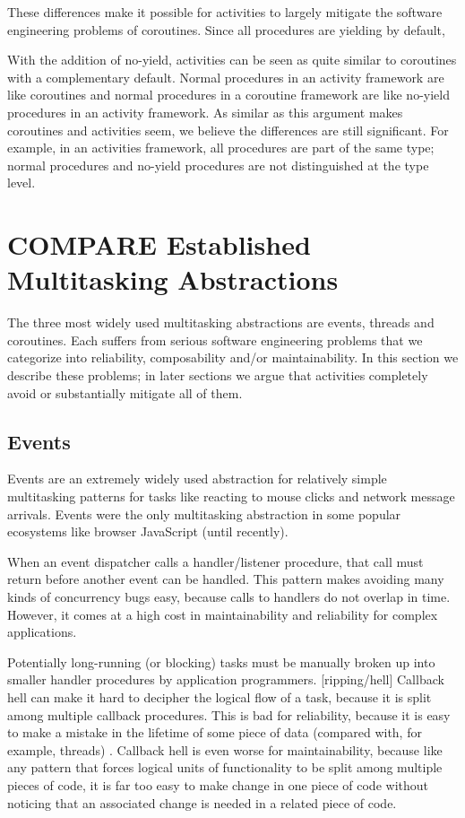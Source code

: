 \documentclass[10pt,preprint]{sigplanconf}
\begin{document}
These differences make it possible for activities to largely mitigate the software engineering problems of coroutines.
Since all procedures are yielding by default, 

With the addition of no-yield, activities can be seen as quite similar to coroutines with a complementary default.
Normal procedures in an activity framework are like coroutines and normal procedures in a coroutine framework are like no-yield procedures in an activity framework.
As similar as this argument makes coroutines and activities seem, we believe the differences are still significant.
For example, in an activities framework, all procedures are part of the same type; normal procedures and no-yield procedures are not distinguished at the type level.

\section{COMPARE Established Multitasking Abstractions}



The three most widely used multitasking abstractions are events, threads and coroutines.
Each suffers from serious software engineering problems that we categorize into reliability, composability and/or maintainability.
In this section we describe these problems; in later sections we argue that activities completely avoid or substantially mitigate all of them.

\subsection{Events}

Events are an extremely widely used abstraction for relatively simple multitasking patterns for tasks like reacting to mouse clicks and network message arrivals.
Events were the only multitasking abstraction in some popular ecosystems like browser JavaScript (until recently).

When an event dispatcher calls a handler/listener procedure, that call must return before another event can be handled.
This pattern makes avoiding many kinds of concurrency bugs easy, because calls to handlers do not overlap in time.
However, it comes at a high cost in maintainability and reliability for complex applications.

Potentially long-running (or blocking) tasks must be manually broken up into smaller handler procedures by application programmers.
[ripping/hell]
Callback hell can make it hard to decipher the logical flow of a task, because it is split among  multiple callback procedures.
This is bad for reliability, because it is easy to make a mistake in the lifetime of some piece of data (compared with, for example, threads) \cite{Behren2003a}.
Callback hell is even worse for maintainability, because like any pattern that forces logical units of functionality to be split among multiple pieces of code, it is far too easy to make change in one piece of code without noticing that an associated change is needed in a related piece of code.
\end{document}
